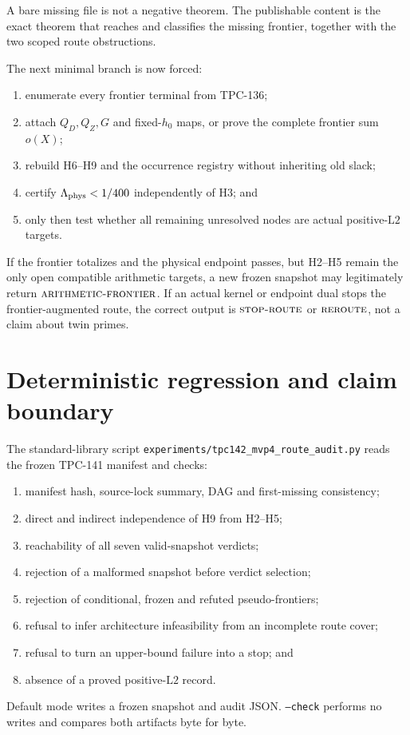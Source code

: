 \documentclass[11pt]{article}
\theoremstyle{definition}
\theoremstyle{remark}
\newcommand{\REROUTE}{\textnormal{\textsc{reroute}}}
\newcommand{\STOPR}{\textnormal{\textsc{stop-route}}}
\newcommand{\AF}{\textnormal{\textsc{arithmetic-frontier}}}
\newcommand{\Ltwo}{\mathrm{L2}}
\begin{document}
A bare missing file is not a negative theorem.  The publishable
content is the exact theorem that reaches and classifies the missing
frontier, together with the two scoped route obstructions.

The next minimal branch is now forced:
\begin{enumerate}[leftmargin=2em]
\item enumerate every frontier terminal from TPC-136;
\item attach \(Q_D,Q_Z,G\) and fixed-\(h_0\) maps, or prove the
  complete frontier sum \(o(X)\);
\item rebuild H6--H9 and the occurrence registry without inheriting
  old slack;
\item certify \(\Lambda_{\rm phys}<1/400\) independently of H3; and
\item only then test whether all remaining unresolved nodes are
  actual positive-\(\Ltwo\) targets.
\end{enumerate}

If the frontier totalizes and the physical endpoint passes, but H2--H5
remain the only open compatible arithmetic targets, a new frozen
snapshot may legitimately return \(\AF\).  If an actual kernel or
endpoint dual stops the frontier-augmented route, the correct output
is \(\STOPR\) or \(\REROUTE\), not a claim about twin primes.

\section{Deterministic regression and claim boundary}

The standard-library script
\texttt{experiments/tpc142\_mvp4\_route\_audit.py} reads the frozen
TPC-141 manifest and checks:
\begin{enumerate}[leftmargin=2em]
\item manifest hash, source-lock summary, DAG and first-missing
  consistency;
\item direct and indirect independence of H9 from H2--H5;
\item reachability of all seven valid-snapshot verdicts;
\item rejection of a malformed snapshot before verdict selection;
\item rejection of conditional, frozen and refuted pseudo-frontiers;
\item refusal to infer architecture infeasibility from an incomplete
  route cover;
\item refusal to turn an upper-bound failure into a stop; and
\item absence of a proved positive-\(\Ltwo\) record.
\end{enumerate}
Default mode writes a frozen snapshot and audit JSON.
\texttt{--check} performs no writes and compares both artifacts byte
for byte.
\end{document}
